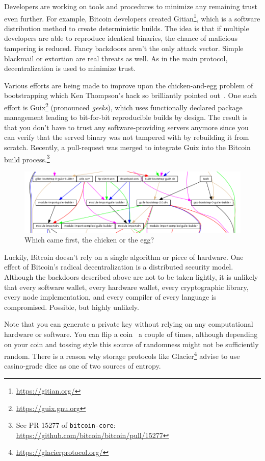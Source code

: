 Developers are working on tools and procedures to minimize any remaining trust
even further. For example, Bitcoin developers created
Gitian\footnote{\url{https://gitian.org/}}, which is a software distribution
method to create deterministic builds. The idea is that if multiple developers
are able to reproduce identical binaries, the chance of malicious tampering is
reduced. Fancy backdoors aren't the only attack vector. Simple blackmail or
extortion are real threats as well. As in the main protocol, decentralization is
used to minimize trust.

Various efforts are being made to improve upon the chicken-and-egg problem of
bootstrapping which Ken Thompson's hack so brilliantly pointed
out~\cite{web:bootstrapping}. One such effort is
Guix\footnote{\url{https://guix.gnu.org}} (pronounced \textit{geeks}), which
uses functionally declared package management leading to bit-for-bit
reproducible builds by design. The result is that you don't have to trust any
software-providing servers anymore since you can verify that the served binary
was not tampered with by rebuilding it from scratch. Recently, a
pull-request was merged to integrate Guix into the Bitcoin build process.\footnote{See PR 15277 of \texttt{bitcoin-core}: \\ \url{https://github.com/bitcoin/bitcoin/pull/15277}}

\begin{figure}
  \includegraphics{assets/images/guix-bootstrap-dependencies.png}
  \caption{Which came first, the chicken or the egg?}
  \label{fig:guix-bootstrap-dependencies}
\end{figure}

Luckily, Bitcoin doesn't rely on a single algorithm or piece of
hardware. One effect of Bitcoin's radical decentralization is a
distributed security model. Although the backdoors described above are
not to be taken lightly, it is unlikely that every software wallet,
every hardware wallet, every cryptographic library, every node
implementation, and every compiler of every language is compromised.
Possible, but highly unlikely.

Note that you can generate a private key without relying on any computational
hardware or software. You can flip a coin~\cite{antonopoulos2014mastering} a
couple of times, although depending on your coin and tossing style this source
of randomness might not be sufficiently random. There is a reason why storage
protocols like Glacier\footnote{\url{https://glacierprotocol.org/}} advise to
use casino-grade dice as one of two sources of entropy.

